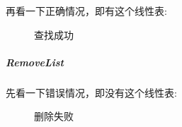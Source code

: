\documentclass[supercite]{Experimental_Report}
\theoremstyle{definition}
\begin{document}
\noindent
再看一下正确情况，即有这个线性表:
\begin{figure}[htbp]
	\centering
	\centering
	\caption{查找成功}
	\label{fig2-9}
\end{figure}

\clearpage
\subparagraph{RemoveList}
\noindent
先看一下错误情况，即没有这个线性表:
\begin{figure}[htbp]
	\centering
	\centering
	\caption{删除失败}
	\label{fig2-10}
\end{figure}
\end{document}
